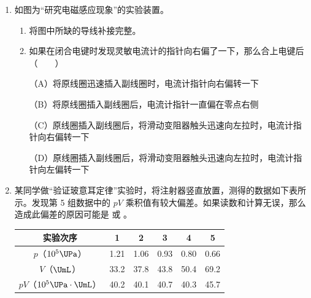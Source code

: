 \documentclass[\gkver]{gaokaozhenti}
\begin{document}
\begin{enumerate}
\item
如图为“研究电磁感应现象”的实验装置。
\begin{enumerate}
	\item
	将图中所缺的导线补接完整。
	\item
	如果在闭合电键时发现灵敏电流计的指针向右偏了一下，那么合上电键后（　　）

	（A）将原线圈迅速插入副线圈时，电流计指针向右偏转一下

	（B）将原线圈插入副线圈后，电流计指针一直偏在零点右侧

	（C）原线圈插入副线圈后，将滑动变阻器触头迅速向左拉时，电流计指针向右偏转一下

	（D）原线圈插入副线圈后，将滑动变阻器触头迅速向左拉时，电流计指针向左偏转一下
\end{enumerate}

\item
某同学做“验证玻意耳定律”实验时，将注射器竖直放置，测得的数据如下表所示。发现第 5 组数据中的 $pV$ 乘积值有较大偏差。如果读数和计算无误，那么造成此偏差的原因可能是  或 。

\begin{center}
\begin{tabular}{|c|c|c|c|c|c|}
\hline
实验次序 & 1 & 2 & 3 & 4 & 5 \\
\hline
$p$（$10^{5}\UPa$） & 1.21 & 1.06 & 0.93 & 0.80 & 0.66 \\
\hline
$V$（$\UmL$） & 33.2 & 37.8 & 43.8 & 50.4 & 69.2 \\
\hline
$pV$（$10^{5}\UPa\cdot\UmL$） & 40.2 & 40.1 & 40.7 & 40.3 & 45.7 \\
\hline
\end{tabular}
\end{center}


\end{enumerate}
\end{document}
